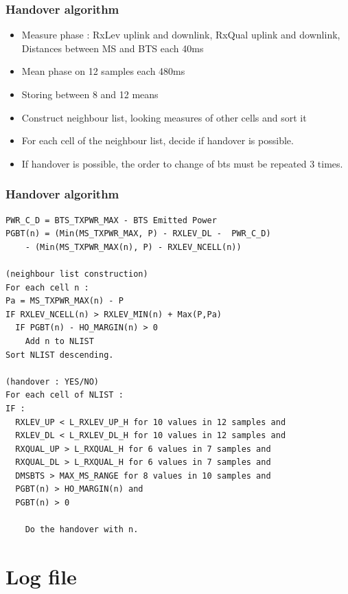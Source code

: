 \documentclass{beamer}
\begin{document}
\begin{frame}
\frametitle{Handover algorithm}
\begin{itemize}
  \item Measure phase : RxLev uplink and downlink, RxQual uplink and downlink, Distances between MS and BTS each 40ms
  \item Mean phase on 12 samples each 480ms
  \item Storing between 8 and 12 means
  \item Construct neighbour list, looking measures of other cells and sort it
  \item For each cell of the neighbour list, decide if handover is possible.
  \item If handover is possible, the order to change of bts must be repeated 3
times.
\end{itemize}
\end{frame}
\begin{frame}[fragile]
\frametitle{Handover algorithm}

{\tiny
\begin{verbatim}
PWR_C_D = BTS_TXPWR_MAX - BTS Emitted Power
PGBT(n) = (Min(MS_TXPWR_MAX, P) - RXLEV_DL -  PWR_C_D)
    - (Min(MS_TXPWR_MAX(n), P) - RXLEV_NCELL(n))

(neighbour list construction)
For each cell n :
Pa = MS_TXPWR_MAX(n) - P
IF RXLEV_NCELL(n) > RXLEV_MIN(n) + Max(P,Pa)
  IF PGBT(n) - HO_MARGIN(n) > 0
    Add n to NLIST
Sort NLIST descending.

(handover : YES/NO)
For each cell of NLIST :
IF :
  RXLEV_UP < L_RXLEV_UP_H for 10 values in 12 samples and
  RXLEV_DL < L_RXLEV_DL_H for 10 values in 12 samples and
  RXQUAL_UP > L_RXQUAL_H for 6 values in 7 samples and 
  RXQUAL_DL > L_RXQUAL_H for 6 values in 7 samples and
  DMSBTS > MAX_MS_RANGE for 8 values in 10 samples and
  PGBT(n) > HO_MARGIN(n) and
  PGBT(n) > 0

    Do the handover with n.
\end{verbatim}
}

\end{frame}

\section{Log file}
\end{document}
